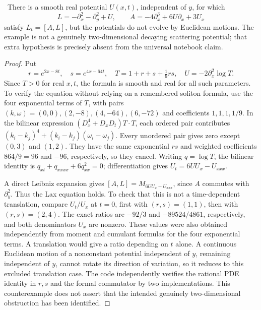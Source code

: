 \begin{proposition}\ours\
There is a smooth real potential \(U(x,t)\), independent of \(y\), for which
\[
 L=-\partial_x^2-\partial_y^2+U,\qquad
 A=-4\partial_x^3+6U\partial_x+3U_x
\]
satisfy \(L_t=[A,L]\), but the potentials do not evolve by Euclidean motions.
The example is not a genuinely two-dimensional decaying scattering potential;
that extra hypothesis is precisely absent from the universal notebook claim.
\end{proposition}
\begin{proof}
Put
\[
 r=e^{2x-8t},\quad s=e^{4x-64t},\quad
 T=1+r+s+\tfrac19rs,\quad U=-2\partial_x^2\log T.
\]
Since \(T>0\) for real \(x,t\), the formula is smooth and real for all such
parameters. To verify the equation without relying on a remembered soliton
formula, use the four exponential terms of \(T\), with pairs
\((k,\omega)=(0,0),(2,-8),(4,-64),(6,-72)\) and coefficients
\(1,1,1,1/9\). In the bilinear expression
\((D_x^4+D_xD_t)T\mathbin{\cdot}T\), each ordered pair contributes
\((k_i-k_j)^4+(k_i-k_j)(\omega_i-\omega_j)\).
Every unordered pair gives zero except \((0,3)\) and \((1,2)\). They have the
same exponential \(rs\) and weighted coefficients \(864/9=96\) and \(-96\),
respectively, so they cancel. Writing \(q=\log T\), the bilinear identity is
\(q_{xt}+q_{xxxx}+6q_{xx}^2=0\); differentiation gives
\(U_t=6UU_x-U_{xxx}\).

A direct Leibniz expansion gives
\([A,L]=M_{6UU_x-U_{xxx}}\), since \(A\) commutes with
\(\partial_y^2\). Thus the Lax equation holds. To check that this is not a
time-dependent translation, compare \(U_t/U_x\) at \(t=0\), first with
\((r,s)=(1,1)\), then with \((r,s)=(2,4)\). The exact ratios are $-92/3$ and $-89524/4861$, respectively, and both denominators $U_x$ are nonzero. These values were also obtained independently from moment and cumulant formulas for the four exponential terms. A translation would give a
ratio depending on \(t\) alone. A continuous Euclidean motion of a nonconstant
potential independent of \(y\), remaining independent of \(y\), cannot rotate
its direction of variation, so it reduces to this excluded translation case.
The code independently verifies the rational PDE identity in \(r,s\) and the
formal commutator by two implementations. This counterexample does not assert
that the intended genuinely two-dimensional obstruction has been identified.
\end{proof}

